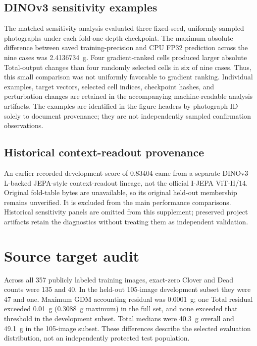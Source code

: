 \documentclass[pdflatex,a4paper,sn-nature]{sn-jnl}
\begin{document}
\subsection*{DINOv3 sensitivity examples}
The matched sensitivity analysis evaluated three fixed-seed, uniformly sampled photographs under each fold-one depth checkpoint. The maximum absolute difference between saved training-precision and CPU FP32 prediction across the nine cases was 2.4136734~g. Four gradient-ranked cells produced larger absolute Total-output changes than four randomly selected cells in six of nine cases. Thus, this small comparison was not uniformly favorable to gradient ranking. Individual examples, target vectors, selected cell indices, checkpoint hashes, and perturbation changes are retained in the accompanying machine-readable analysis artifacts. The examples are identified in the figure headers by photograph ID solely to document provenance; they are not independently sampled confirmation observations.

\subsection*{Historical context-readout provenance}
An earlier recorded development score of 0.83404 came from a separate DINOv3-L-backed JEPA-style context-readout lineage, not the official I-JEPA ViT-H/14. Original fold-table bytes are unavailable, so its original held-out membership remains unverified. It is excluded from the main performance comparisons. Historical sensitivity panels are omitted from this supplement; preserved project artifacts retain the diagnostics without treating them as independent validation.

\section*{Source target audit}
Across all 357 publicly labeled training images, exact-zero Clover and Dead counts were 135 and 40. In the held-out 105-image development subset they were 47 and one. Maximum GDM accounting residual was 0.0001~g; one Total residual exceeded 0.01~g (0.3088~g maximum) in the full set, and none exceeded that threshold in the development subset. Total medians were 40.3~g overall and 49.1~g in the 105-image subset. These differences describe the selected evaluation distribution, not an independently protected test population.
\end{document}
